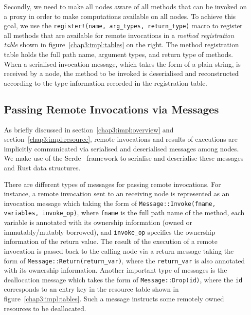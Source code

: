 Secondly, we need to make all nodes aware of all methods that can be invoked on a proxy in order to make computations available on all nodes. To achieve this goal, we use the \lstinline{register!(name, arg_types, return_type)} macro to register all methods that are available for remote invocations in a \emph{method registration table} shown in figure~\ref{chap3:impl:tables} on the right. The method registration table holds the full path name, argument types, and return type of methods. When a serialised invocation message, which takes the form of a plain string, is received by a node, the method to be invoked is deserialised and reconstructed according to the type information recorded in the registration table.

\subsection{Passing Remote Invocations via Messages}
\label{impl:message}
As briefly discussed in section~\ref{chap3:impl:overview} and section~\ref{chap3:impl:resource}, remote invocations and results of executions are implicitly communicated via serialised and deserialised messages among nodes. We make use of the Serde~\citep{serde} framework to serialise and deserialise these messages and Rust data structures.

There are different types of messages for passing remote invocations. For instance, a remote invocation sent to an receiving node is represented as an invocation message which taking the form of \lstinline{Message::Invoke(fname, variables, invoke_op)}, where \lstinline{fname} is the full path name of the method, each variable is annotated with its ownership information (owned or immutably/mutably borrowed), and \lstinline{invoke_op} specifies the ownership information of the return value. The result of the execution of a remote invocation is passed back to the calling node via a return message taking the form of \lstinline{Message::Return(return_var)}, where the \lstinline{return_var} is also annotated with its ownership information. Another important type of messages is the deallocation message which takes the form of \lstinline{Message::Drop(id)}, where the \lstinline{id} corresponds to an entry key in the resource table shown in figure~\ref{chap3:impl:tables}. Such a message instructs some remotely owned resources to be deallocated.


